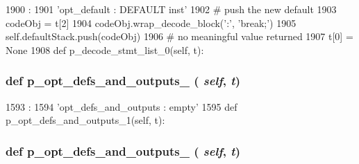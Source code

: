 \begin{DoxyCode}
1900                                 :
1901         'opt_default : DEFAULT inst'
1902         # push the new default
1903         codeObj = t[2]
1904         codeObj.wrap_decode_block('\ndefault:\n', 'break;\n')
1905         self.defaultStack.push(codeObj)
1906         # no meaningful value returned
1907         t[0] = None
1908 
    def p_decode_stmt_list_0(self, t):
\end{DoxyCode}
\hypertarget{classisa__parser_1_1ISAParser_a698409d13c0ca38fa38cbdbaf265832d}{
\subsubsection[{p\_\-opt\_\-defs\_\-and\_\-outputs\_\-0}]{\setlength{\rightskip}{0pt plus 5cm}def p\_\-opt\_\-defs\_\-and\_\-outputs\_ ( {\em self}, \/   {\em t})}}
\label{classisa__parser_1_1ISAParser_a698409d13c0ca38fa38cbdbaf265832d}



\begin{DoxyCode}
1593                                          :
1594         'opt_defs_and_outputs : empty'
1595 
    def p_opt_defs_and_outputs_1(self, t):
\end{DoxyCode}
\hypertarget{classisa__parser_1_1ISAParser_a66c65954e1db9ce43456d60351f70871}{
\subsubsection[{p\_\-opt\_\-defs\_\-and\_\-outputs\_\-1}]{\setlength{\rightskip}{0pt plus 5cm}def p\_\-opt\_\-defs\_\-and\_\-outputs\_ ( {\em self}, \/   {\em t})}}
\label{classisa__parser_1_1ISAParser_a66c65954e1db9ce43456d60351f70871}



